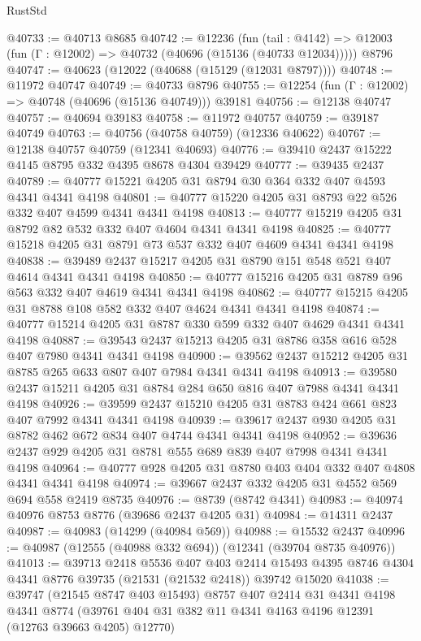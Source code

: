 \begin{lexlean}{RustStd}
\begin{coremodule}
@40733 := @40713 @8685
@40742 := @12236
    (fun (tail : @4142) => @12003 (fun (Γ : @12002) => @40732 (@40696 (@15136 (@40733 @12034)))))
    @8796
@40747 := @40623 (@12022 (@40688 (@15129 (@12031 @8797))))
@40748 := @11972 @40747
@40749 := @40733 @8796
@40755 := @12254 (fun (Γ : @12002) => @40748 (@40696 (@15136 @40749))) @39181
@40756 := @12138 @40747
@40757 := @40694 @39183
@40758 := @11972 @40757
@40759 := @39187 @40749
@40763 := @40756 (@40758 @40759) (@12336 @40622)
@40767 := @12138 @40757 @40759 (@12341 @40693)
@40776 := @39410 @2437 @15222 @4145 @8795 @332 @4395 @8678 @4304 @39429
@40777 := @39435 @2437
@40789 := @40777 @15221 @4205 @31 @8794 @30 @364 @332 @407 @4593 @4341 @4341 @4198
@40801 := @40777 @15220 @4205 @31 @8793 @22 @526 @332 @407 @4599 @4341 @4341 @4198
@40813 := @40777 @15219 @4205 @31 @8792 @82 @532 @332 @407 @4604 @4341 @4341 @4198
@40825 := @40777 @15218 @4205 @31 @8791 @73 @537 @332 @407 @4609 @4341 @4341 @4198
@40838 := @39489 @2437 @15217 @4205 @31 @8790 @151 @548 @521 @407 @4614 @4341 @4341 @4198
@40850 := @40777 @15216 @4205 @31 @8789 @96 @563 @332 @407 @4619 @4341 @4341 @4198
@40862 := @40777 @15215 @4205 @31 @8788 @108 @582 @332 @407 @4624 @4341 @4341 @4198
@40874 := @40777 @15214 @4205 @31 @8787 @330 @599 @332 @407 @4629 @4341 @4341 @4198
@40887 := @39543 @2437 @15213 @4205 @31 @8786 @358 @616 @528 @407 @7980 @4341 @4341 @4198
@40900 := @39562 @2437 @15212 @4205 @31 @8785 @265 @633 @807 @407 @7984 @4341 @4341 @4198
@40913 := @39580 @2437 @15211 @4205 @31 @8784 @284 @650 @816 @407 @7988 @4341 @4341 @4198
@40926 := @39599 @2437 @15210 @4205 @31 @8783 @424 @661 @823 @407 @7992 @4341 @4341 @4198
@40939 := @39617 @2437 @930 @4205 @31 @8782 @462 @672 @834 @407 @4744 @4341 @4341 @4198
@40952 := @39636 @2437 @929 @4205 @31 @8781 @555 @689 @839 @407 @7998 @4341 @4341 @4198
@40964 := @40777 @928 @4205 @31 @8780 @403 @404 @332 @407 @4808 @4341 @4341 @4198
@40974 := @39667 @2437 @332 @4205 @31 @4552 @569 @694 @558 @2419 @8735
@40976 := @8739 (@8742 @4341)
@40983 := @40974 @40976 @8753 @8776 (@39686 @2437 @4205 @31)
@40984 := @14311 @2437
@40987 := @40983 (@14299 (@40984 @569))
@40988 := @15532 @2437
@40996 := @40987 (@12555 (@40988 @332 @694)) (@12341 (@39704 @8735 @40976))
@41013 := @39713
    @2418
    @5536
    @407
    @403
    @2414
    @15493
    @4395
    @8746
    @4304
    @4341
    @8776
    @39735
    (@21531 (@21532 @2418))
    @39742
    @15020
@41038 := @39747
    (@21545 @8747 @403 @15493)
    @8757
    @407
    @2414
    @31
    @4341
    @4198
    @4341
    @8774
    (@39761 @404 @31 @382 @11 @4341 @4163 @4196 @12391 (@12763 @39663 @4205) @12770)

\end{coremodule}
\end{lexlean}
